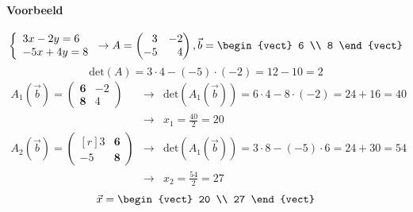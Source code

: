 \paragraph{Voorbeeld}
\[ \left\{\begin{array}{l}
	3x - 2y = 6 \\
	-5x + 4y = 8
\end{array}\right. \to A = \begin{pmatrix*}[r] 3 & -2 \\ -5 & 4 \end{pmatrix*}, \vec{b} = \begin{vect} 6 \\ 8 \end{vect} \]
\[ \mbox{det}(A) = 3 \cdot 4 - (-5) \cdot (-2) = 12 - 10 = 2 \]
\begin{eqnarray*}
	A_1(\vec{b}) = \begin{pmatrix} \mathbf{6} & -2 \\ \mathbf{8} & 4 \end{pmatrix} &\to& \mbox{det}(A_1(\vec{b})) = 6 \cdot 4 - 8 \cdot (-2) = 24 + 16 = 40 \\
	&\to& x_1 = \frac{40}{2} = 20 \\
	A_2(\vec{b}) = \begin{pmatrix*}[r] 3 & \mathbf{6} \\ -5 & \mathbf{8}\end{pmatrix*} &\to& \mbox{det}(A_1(\vec{b})) = 3 \cdot 8 - (-5) \cdot 6 = 24 + 30 = 54 \\
		&\to& x_2 = \frac{54}{2} = 27
\end{eqnarray*}
\[ \vec{x} = \begin{vect} 20 \\ 27 \end{vect} \]

